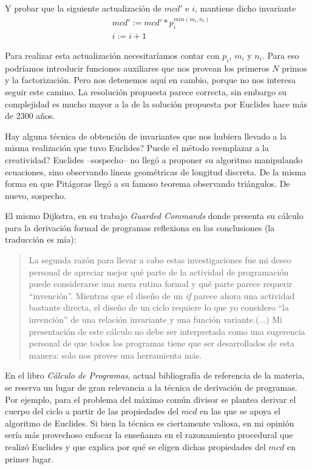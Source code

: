 \documentclass[12pt, a4paper, openany, fleqn]{book}
\begin{document}
    Y probar que la siguiente actualización de $mcd'$ e $i$, mantiene dicho invariante
    \begin{align*}
        & mcd' := mcd' * p_{i}^{min(m_{i}, n_{i})} \\
        & i := i + 1
    \end{align*}

    Para realizar esta actualización necesitaríamos contar con $p_{i}$, $m_{i}$ y $n_{i}$. Para eso podríamos introducir funciones auxiliares que nos provean los primeros $N$ primos y la factorización. Pero nos detenemos aquí en cambio, porque no nos interesa seguir este camino. La resolución propuesta parece correcta, sin embargo su complejidad es mucho mayor a la de la solución propuesta por Euclides hace más de 2300 años.

    Hay alguna técnica de obtención de invariantes que nos hubiera llevado a la misma realización que tuvo Euclides? Puede el método reemplazar a la creatividad?
    Euclides --sospecho-- no llegó a proponer su algoritmo manipulando ecuaciones, sino observando líneas geométricas de longitud discreta. De la misma forma en que Pitágoras llegó a su famoso teorema observando triángulos. De nuevo, sospecho.

    El mismo Dijkstra, en su trabajo \emph{Guarded Commands}\cite[p. 12]{EWD:EWD418} donde presenta su cálculo para la derivación formal de programas reflexiona en las conclusiones (la traducción es mía):

    \blockquote{
        La segunda razón para llevar a cabo estas investigaciones fue mi deseo personal de apreciar mejor qué parte de la actividad de programación puede considerarse una mera rutina formal y qué parte parece requerir ``invención''. Mientras que el diseño de un \textit{if} parece ahora una actividad bastante directa, el diseño de un ciclo requiere lo que yo considero ``la invención'' de una relación invariante y una función variante.(...) Mi presentación de este cálculo no debe ser interpretada como una sugerencia personal de que todos los programas tiene que ser desarrollados de esta manera: solo nos provee una herramienta más.
    }

    En el libro \emph{Cálculo de Programas}, actual bibliografía de referencia de la materia, se reserva un lugar de gran relevancia a la técnica de derivación de programas. Por ejemplo, para el problema del máximo común divisor se plantea derivar el cuerpo del ciclo a partir de las propiedades del $mcd$ en las que se apoya el algoritmo de Euclides.
    Si bien la técnica es ciertamente valiosa, en mi opinión sería más provechoso enfocar la enseñanza en el razonamiento procedural que realizó Euclides y que explica por qué se eligen dichas propiedades del $mcd$ en primer lugar.
\end{document}

